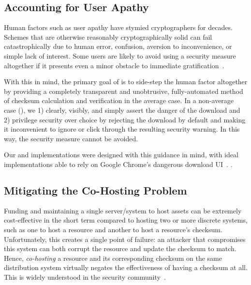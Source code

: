 \subsection{Accounting for User Apathy}

Human factors such as user apathy have stymied cryptographers for decades.
Schemes that are otherwise reasonably cryptographically solid can fail
catastrophically due to human error, confusion, aversion to inconvenience, or
simple lack of interest. Some users are likely to avoid using a security measure
altogether if it presents even a minor obstacle to immediate
gratification~\cite{Clickthrough, PGPBad, Egelman1, Egelman2, Jenkins, Modic,
Reeder, Silic, Sunshine, Bianchi, Akhawe, Cherubini}.


With this in mind, the primary goal of \SYSTEM{} is to side-step the human
factor altogether by providing a completely transparent and unobtrusive,
fully-automated method of checksum calculation and verification in the average
case. In a non-average case (), we
1) clearly, visibly, and simply assert the danger of the download and 2)
privilege security over choice by rejecting the download by default and making
it inconvenient to ignore or click through the resulting security warning. In
this way, the security measure cannot be avoided.

Our \DNSSYS{} and \DHTSYS{} implementations were designed with this guidance in
mind, with ideal implementations able to rely on Google Chrome's dangerous
download UI~\cite{ChromeClickThrough}. .

\subsection{Mitigating the Co-Hosting Problem}

Funding and maintaining a single server/system to host assets can be extremely
cost-effective in the short term compared to hosting two or more discrete
systems, such as one to host a resource and another to host a resource's
checksum. Unfortunately, this creates a single point of failure: an attacker
that compromises this system can both corrupt the resource and update the
checksum to match. Hence, \emph{co-hosting} a resource and its
corresponding checksum on the same distribution system virtually negates the
effectiveness of having a checksum at all. This is widely understood in the
security community~\cite{SCA-MINT2, Cherubini, Stickler}.

